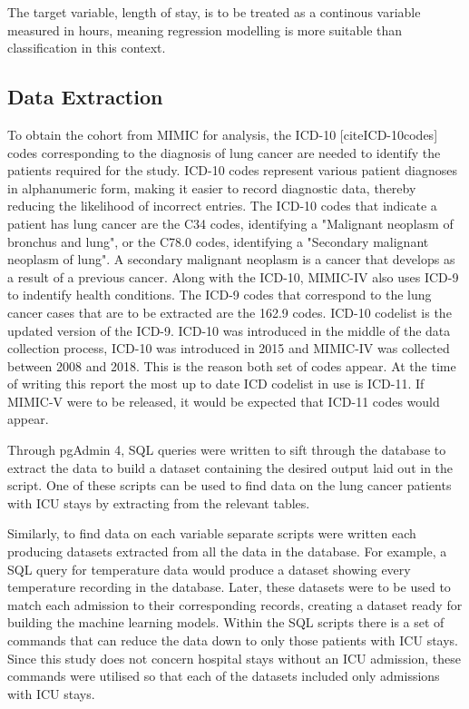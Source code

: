 \documentclass[11pt]{article}
\begin{document}
The target variable, length of stay, is to be treated as a continous variable measured in hours, meaning regression modelling is more suitable than classification in this context.


\subsection{Data Extraction}
To obtain the cohort from MIMIC for analysis, the ICD-10 [cite{ICD-10codes}] codes corresponding to the diagnosis of lung cancer are needed to identify the patients required for the study. ICD-10 codes represent various patient diagnoses in alphanumeric form, making it easier to record diagnostic data, thereby reducing the likelihood of incorrect entries. The ICD-10 codes that indicate a patient has lung cancer are the C34 codes, identifying a "Malignant neoplasm of bronchus and lung", or the C78.0 codes, identifying a "Secondary malignant neoplasm of lung". A secondary malignant neoplasm is a cancer that develops as a result of a previous cancer. Along with the ICD-10, MIMIC-IV also uses ICD-9 to indentify health conditions. The ICD-9 codes that correspond to the lung cancer cases that are to be extracted are the 162.9 codes. ICD-10 codelist is the updated version of the ICD-9. ICD-10 was introduced in the middle of the data collection process, ICD-10 was introduced in 2015 and MIMIC-IV was collected between 2008 and 2018. This is the reason both set of codes appear. At the time of writing this report the most up to date ICD codelist in use is ICD-11. If MIMIC-V were to be released, it would be expected that ICD-11 codes would appear.

Through pgAdmin 4, SQL queries were written to sift through the database to extract the data to build a dataset containing the desired output laid out in the script. One of these scripts can be used to find data on the lung cancer patients with ICU stays by extracting from the relevant tables.

Similarly, to find data on each variable separate scripts were written each producing datasets extracted from all the data in the database. For example, a SQL query for temperature data would produce a dataset showing every temperature recording in the database. Later, these datasets were to be used to match each admission to their corresponding records, creating a dataset ready for building the machine learning models. Within the SQL scripts there is a set of commands that can reduce the data down to only those patients with ICU stays. Since this study does not concern hospital stays without an ICU admission, these commands were utilised so that each of the datasets included only admissions with ICU stays.
\end{document}
